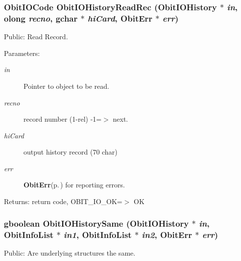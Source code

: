 \subsubsection{\setlength{\rightskip}{0pt plus 5cm}Obit\-IOCode Obit\-IOHistory\-Read\-Rec ({\bf Obit\-IOHistory} $\ast$ {\em in}, {\bf olong} {\em recno}, gchar $\ast$ {\em hi\-Card}, {\bf Obit\-Err} $\ast$ {\em err})}\label{ObitIOHistory_8c_a14}


Public: Read Record. 

\begin{Desc}
\item[Parameters:]
\begin{description}
\item[{\em in}]Pointer to object to be read. \item[{\em recno}]record number (1-rel) -1=$>$ next. \item[{\em hi\-Card}]output history record (70 char) \item[{\em err}]{\bf Obit\-Err}{\rm (p.\,\pageref{structObitErr})} for reporting errors. \end{description}
\end{Desc}
\begin{Desc}
\item[Returns:]return code, OBIT\_\-IO\_\-OK=$>$ OK \end{Desc}
\subsubsection{\setlength{\rightskip}{0pt plus 5cm}gboolean Obit\-IOHistory\-Same ({\bf Obit\-IOHistory} $\ast$ {\em in}, {\bf Obit\-Info\-List} $\ast$ {\em in1}, {\bf Obit\-Info\-List} $\ast$ {\em in2}, {\bf Obit\-Err} $\ast$ {\em err})}\label{ObitIOHistory_8c_a8}


Public: Are underlying structures the same. 

